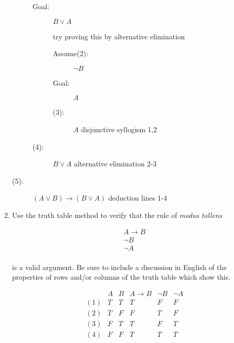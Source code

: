 \documentclass[12pt]{article}
\begin{document}
\begin{enumerate}
\begin{description}
\begin{description}
\item[Goal:]  $B \vee A$

try proving this by alternative elimination

\begin{description}

\item[Assume(2):]  $\neg B$

\item[Goal:]  $A$

\item [(3):]  $A$ disjunctive syllogism 1,2

\end{description}

\item[(4):]  $B \vee A$ alternative elimination 2-3

\end{description}

\item[(5):]  $(A \vee B) \rightarrow (B \vee A)$  deduction lines 1-4



\end{description}

\item Use the truth table method to verify that the rule of {\em modus tollens\/}

$$\begin{array}{c}

A \rightarrow B \\ 

\neg B \\ \hline

\neg A \\

\end{array}$$

is a valid argument.  Be sure to include a discussion in English of the properties of rows and/or columns of the truth table which show this.

$$\begin{array}{c|cc|cc|c}

 & A & B & A \rightarrow B & \neg B & \neg A \\ \hline
(1) & T & T & T & F & F \\
(2) & T & F & F & T & F \\
(3) & F & T & T & F & T \\
(4) & F & F & T & T & T \\

\end{array}$$


\end{enumerate}
\end{document}
